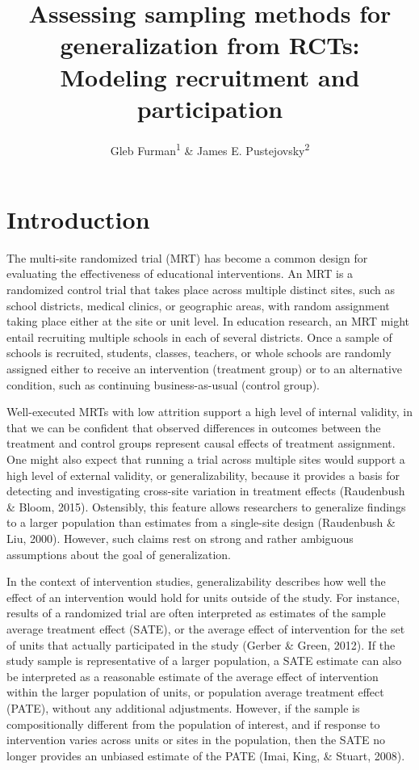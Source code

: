 \documentclass[english,man,floatsintext]{apa6}
\title{Assessing sampling methods for generalization from RCTs: Modeling recruitment and participation}
\author{Gleb Furman\textsuperscript{1} \& James E. Pustejovsky\textsuperscript{2}}
\date{}
\affiliation{\vspace{0.5cm}\textsuperscript{1} University of Texas at Austin\\\textsuperscript{2} University of Wisconsin-Madison}
\begin{document}
\maketitle

\hypertarget{introduction}{%
\section{Introduction}\label{introduction}}

The multi-site randomized trial (MRT) has become a common design for evaluating the effectiveness of educational interventions. An MRT is a randomized control trial that takes place across multiple distinct sites, such as school districts, medical clinics, or geographic areas, with random assignment taking place either at the site or unit level. In education research, an MRT might entail recruiting multiple schools in each of several districts. Once a sample of schools is recruited, students, classes, teachers, or whole schools are randomly assigned either to receive an intervention (treatment group) or to an alternative condition, such as continuing business-as-usual (control group).

Well-executed MRTs with low attrition support a high level of internal validity, in that we can be confident that observed differences in outcomes between the treatment and control groups represent causal effects of treatment assignment. One might also expect that running a trial across multiple sites would support a high level of external validity, or generalizability, because it provides a basis for detecting and investigating cross-site variation in treatment effects (Raudenbush \& Bloom, 2015). Ostensibly, this feature allows researchers to generalize findings to a larger population than estimates from a single-site design (Raudenbush \& Liu, 2000). However, such claims rest on strong and rather ambiguous assumptions about the goal of generalization.

In the context of intervention studies, generalizability describes how well the effect of an intervention would hold for units outside of the study. For instance, results of a randomized trial are often interpreted as estimates of the sample average treatment effect (SATE), or the average effect of intervention for the set of units that actually participated in the study (Gerber \& Green, 2012). If the study sample is representative of a larger population, a SATE estimate can also be interpreted as a reasonable estimate of the average effect of intervention within the larger population of units, or population average treatment effect (PATE), without any additional adjustments. However, if the sample is compositionally different from the population of interest, and if response to intervention varies across units or sites in the population, then the SATE no longer provides an unbiased estimate of the PATE (Imai, King, \& Stuart, 2008).
\end{document}

